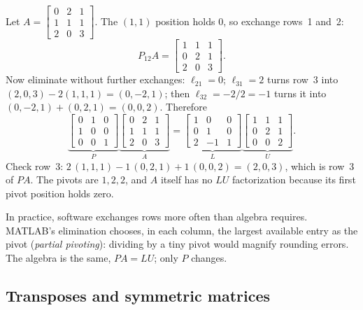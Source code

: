 \begin{example}[A $3\times3$ factorization $PA=LU$]\label{ex:u06-PALU}
Let $A=\begin{bmatrix} 0&2&1\\ 1&1&1\\ 2&0&3\end{bmatrix}$. The $(1,1)$ position holds $0$,
so exchange rows~1 and~2:
\[
  P_{12}A=\begin{bmatrix} 1&1&1\\ 0&2&1\\ 2&0&3\end{bmatrix}.
\]
Now eliminate without further exchanges: $\ell_{21}=0$; $\ell_{31}=2$ turns row~3 into
$(2,0,3)-2(1,1,1)=(0,-2,1)$; then $\ell_{32}=-2/2=-1$ turns it into
$(0,-2,1)+(0,2,1)=(0,0,2)$. Therefore
\[
  \underbrace{\begin{bmatrix} 0&1&0\\ 1&0&0\\ 0&0&1\end{bmatrix}}_{P}
  \underbrace{\begin{bmatrix} 0&2&1\\ 1&1&1\\ 2&0&3\end{bmatrix}}_{A}
  =\underbrace{\begin{bmatrix} 1&0&0\\ 0&1&0\\ 2&-1&1\end{bmatrix}}_{L}
  \underbrace{\begin{bmatrix} 1&1&1\\ 0&2&1\\ 0&0&2\end{bmatrix}}_{U}.
\]
Check row~3: $2\,(1,1,1)-1\,(0,2,1)+1\,(0,0,2)=(2,0,3)$, which is row~3 of $PA$. The pivots
are $1,2,2$, and $A$ itself has no $LU$ factorization because its first pivot position holds
zero.
\end{example}

In practice, software exchanges rows more often than algebra requires. MATLAB's elimination
chooses, in each column, the largest available entry as the pivot (\emph{partial pivoting}):
dividing by a tiny pivot would magnify rounding errors. The algebra is the same, $PA=LU$;
only $P$ changes.

\subsection{Transposes and symmetric matrices}

